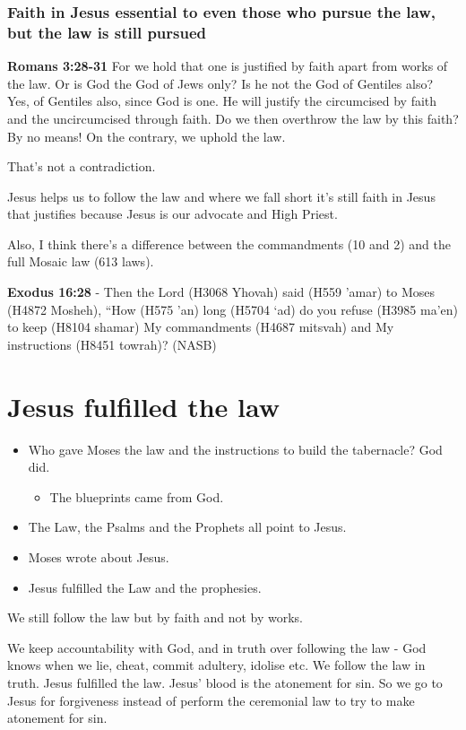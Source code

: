 \documentclass[11pt]{article}
\begin{document}
\subsubsection{Faith in Jesus essential to even those who pursue the law, but the law is still pursued}
\label{sec:orgf7999f6}
\textbf{Romans 3:28-31} For we hold that one is justified by faith apart from works of the law.  Or is God the God of Jews only? Is he not the God of Gentiles also? Yes, of Gentiles also, since God is one. He will justify the circumcised by faith and the uncircumcised through faith.  Do we then overthrow the law by this faith? By no means! On the contrary, we uphold the law.

That's not a contradiction.

Jesus helps us to follow the law and where we fall short it's still faith in Jesus that justifies because Jesus is our advocate and High Priest.

Also, I think there's a difference between the commandments (10 and 2) and the full Mosaic law (613 laws).

\textbf{Exodus 16:28} - Then the Lord (H3068 Yhovah) said (H559 'amar) to Moses (H4872 Mosheh), “How (H575 'an) long (H5704 `ad) do you refuse (H3985 ma'en) to keep (H8104 shamar) My commandments (H4687 mitsvah) and My instructions (H8451 towrah)? (NASB)

\section{Jesus fulfilled the law}
\label{sec:org9f171cd}
\begin{itemize}
\item Who gave Moses the law and the instructions to build the tabernacle? God did.
\begin{itemize}
\item The blueprints came from God.
\end{itemize}
\item The Law, the Psalms and the Prophets all point to Jesus.
\item Moses wrote about Jesus.
\item Jesus fulfilled the Law and the prophesies.
\end{itemize}

We still follow the law but by faith and not by works.

We keep accountability with God, and in truth over following the law - God knows when we lie, cheat, commit adultery, idolise etc.
We follow the law in truth.
Jesus fulfilled the law. Jesus' blood is the atonement for sin.
So we go to Jesus for forgiveness instead of perform the ceremonial law to try to make atonement for sin.
\end{document}
